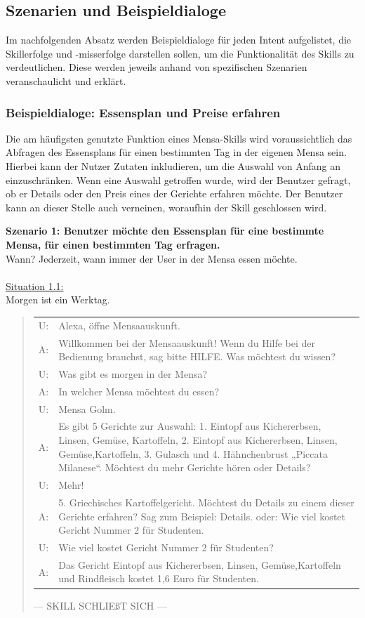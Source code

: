 \documentclass[12pt]{article}
\begin{document}
\subsection{Szenarien und Beispieldialoge}
Im nachfolgenden Absatz werden Beispieldialoge für jeden Intent aufgelistet, die Skillerfolge und -misserfolge darstellen sollen, um die Funktionalität des Skills zu verdeutlichen.
Diese werden jeweils anhand von spezifischen Szenarien veranschaulicht und erklärt.

\subsubsection{Beispieldialoge: Essensplan und Preise erfahren}
Die am häufigsten genutzte Funktion eines Mensa-Skills wird voraussichtlich das Abfragen des Essensplans für einen bestimmten Tag in der eigenen Mensa sein. 
Hierbei kann der Nutzer Zutaten inkludieren, um die Auswahl von Anfang an einzuschränken.
Wenn eine Auswahl getroffen wurde, wird der Benutzer gefragt, ob er Details oder den Preis eines der Gerichte erfahren möchte.
Der Benutzer kann an dieser Stelle auch verneinen, woraufhin der Skill geschlossen wird.

\textbf{Szenario 1: Benutzer möchte den Essensplan für eine bestimmte Mensa, für einen bestimmten Tag erfragen.}\\
Wann? Jederzeit, wann immer der User in der Mensa essen möchte.\\~\\
\ul{Situation 1.1:}\\Morgen ist ein Werktag.\\
\begin{quote}
\begin{tabular}{lp{12cm}}
  U:& Alexa, öffne Mensaauskunft.\\
  A:& Willkommen bei der Mensaauskunft! Wenn du Hilfe bei der Bedienung brauchst, sag bitte HILFE. Was möchtest du wissen?\\
  U:& Was gibt es morgen in der Mensa?\\  
  A:& In welcher Mensa möchtest du essen?\\
  U:& Mensa Golm.\\
  A:& Es gibt 5  Gerichte  zur Auswahl: 1. Eintopf aus Kichererbsen, Linsen, Gemüse, Kartoffeln, 2. Eintopf aus Kichererbsen, Linsen, Gemüse,Kartoffeln, 3. Gulasch und 4. Hähnchenbrust „Piccata Milanese“. Möchtest du mehr Gerichte hören oder Details?\\ 
  U:& Mehr!\\ 
  A:& 5. Griechisches Kartoffelgericht. Möchtest du Details zu einem dieser Gerichte erfahren? Sag zum Beispiel: Details. oder: Wie viel kostet Gericht Nummer 2 für Studenten.\\
  U:& Wie viel kostet Gericht Nummer 2 für Studenten?\\
  A:& Das Gericht Eintopf aus Kichererbsen, Linsen, Gemüse,Kartoffeln und Rindfleisch kostet 1,6 Euro für Studenten.\\[0.2cm]
\end{tabular}
--- SKILL SCHLIEßT SICH ---\\
\end{quote}
\end{document}

